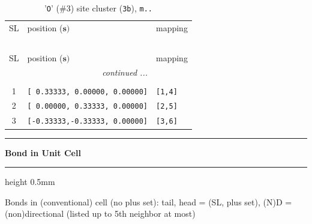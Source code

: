 \documentclass[fleqn,10pt,landscape]{jsarticle}
\begin{document}
\begin{longtable}[l]{cll}
\captionsetup{justification=raggedright, singlelinecheck=off}
\caption{'\texttt{O}' (\#3) site cluster (\texttt{3b}), \texttt{m..}}
 \\
 \hline \hline
SL & position ($\bm{s})$ & mapping \\ \hline \endfirsthead

\multicolumn{2}{l}{\tablename\ \thetable{}} \\
 \hline \hline
SL & position ($\bm{s})$ & mapping \\ \hline \endhead

 \hline \hline
\multicolumn{2}{r}{\footnotesize\it continued ...} \\ \endfoot

 \hline \hline
\multicolumn{2}{r}{} \\ \endlastfoot

1 & \texttt{[ 0.33333, 0.00000, 0.00000]} & \texttt{[1,4]} \\ \hline
2 & \texttt{[ 0.00000, 0.33333, 0.00000]} & \texttt{[2,5]} \\ \hline
3 & \texttt{[-0.33333,-0.33333, 0.00000]} & \texttt{[3,6]} \\
\end{longtable}
\vspace{5mm}
\noindent \rule[0.5mm]{5mm}{0.5mm}\hspace{3mm}\textbf{Bond in Unit Cell}\hspace{3mm}\leaders\hrule height 0.5mm\hfill\kern0pt
\vspace{3mm}

\noindent Bonds in (conventional) cell (no plus set): tail, head = (SL, plus set), (N)D = (non)directional (listed up to 5th neighbor at most)
\end{document}
